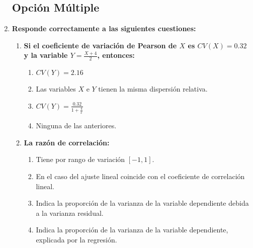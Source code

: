 \documentclass[fleqn]{article}
\begin{document}
        \begin{enumerate}
                
                \subsection{Opción Múltiple}

                \item \textbf{Responde correctamente a las siguientes cuestiones:}
                        \begin{enumerate}
                                \item \textbf{Si el coeficiente de variación de Pearson de $X$ es $CV(X) = 0.32$ y la variable $Y = \frac{X+4}{2}$, entonces:}
                                        \begin{enumerate}
                                                \item $CV(Y) = 2.16$
                                                \item Las variables $X$ e $Y$ tienen la misma dispersión relativa.
                                                \item $CV(Y) = \frac{0.32}{1+\frac{4}{\bar{x}}}$
                                                \item Ninguna de las anteriores.
                                        \end{enumerate}

                                \item \textbf{La razón de correlación:}
                                        \begin{enumerate}
                                                \item Tiene por rango de variación $[-1, 1]$.
                                                \item En el caso del ajuste lineal coincide con el coeficiente de correlación lineal.
                                                \item Indica la proporción de la varianza de la variable dependiente debida a la varianza residual. 
                                                \item Indica la proporción de la varianza de la variable dependiente, explicada por la regresión. 
                                        \end{enumerate}


\end{enumerate}
\end{enumerate}
\end{document}
